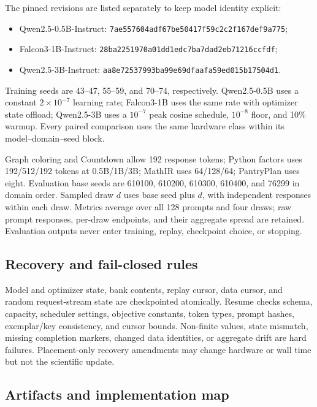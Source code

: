 \documentclass{article}
\newcommand{\1}{\mathbf 1}
\theoremstyle{remark}
\theoremstyle{definition}
\theoremstyle{plain}
\begin{document}
The pinned revisions are listed separately to keep model identity explicit:
\begin{itemize}
  \item Qwen2.5-0.5B-Instruct: {\scriptsize\texttt{7ae557604adf67be50417f59c2c2f167def9a775}};
  \item Falcon3-1B-Instruct: {\scriptsize\texttt{28ba2251970a01dd1edc7ba7dad2eb71216ccfdf}};
  \item Qwen2.5-3B-Instruct: {\scriptsize\texttt{aa8e72537993ba99e69dfaafa59ed015b17504d1}}.
\end{itemize}
Training seeds are 43--47, 55--59, and 70--74, respectively. Qwen2.5-0.5B uses a constant
$2\times10^{-7}$ learning rate; Falcon3-1B uses the same rate with optimizer
state offload; Qwen2.5-3B uses a $10^{-7}$ peak cosine schedule, $10^{-8}$
floor, and 10\% warmup. Every paired comparison uses the same hardware class
within its model--domain--seed block.

Graph coloring and Countdown allow 192 response tokens; Python factors uses
192/512/192 tokens at 0.5B/1B/3B; MathIR uses 64/128/64; PantryPlan uses eight.
Evaluation base seeds are 610100, 610200, 610300, 610400, and 76299 in domain
order. Sampled draw $d$ uses base seed plus $d$, with independent responses
within each draw. Metrics average over all 128 prompts and four draws; raw
prompt responses, per-draw endpoints, and their aggregate spread are retained.
Evaluation outputs never enter training, replay, checkpoint choice, or stopping.

\subsection{Recovery and fail-closed rules}
\label{app:repro-recovery}

Model and optimizer state, bank contents, replay cursor, data cursor, and random
request-stream state are checkpointed atomically. Resume checks schema,
capacity, scheduler settings, objective constants, token types, prompt hashes,
exemplar/key consistency, and cursor bounds. Non-finite values, state mismatch,
missing completion markers, changed data identities, or aggregate drift are
hard failures. Placement-only recovery amendments may change hardware or wall
time but not the scientific update.

\subsection{Artifacts and implementation map}
\label{app:repro-artifacts}
\label{app:repro-code}
\end{document}
